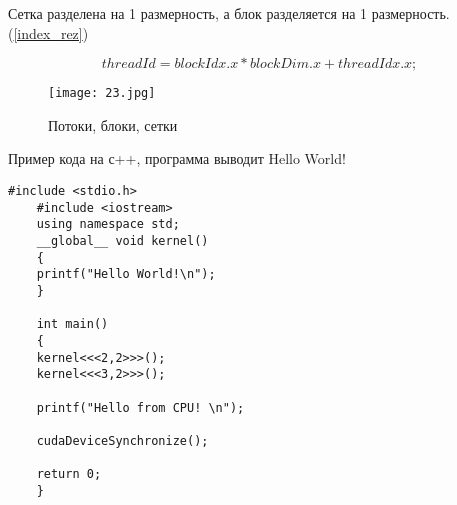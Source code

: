 \documentclass[a4paper, 12pt]{report}
\begin{document}
    Сетка разделена на 1 размерность, а блок разделяется на 1 размерность.(\ref{index_rez})

    \begin{equation}
       	threadId = blockIdx.x *blockDim.x + threadIdx.x;  		
        \label{index_rez}
    \end{equation}

        \begin{figure}[!h]
    \centering
    \texttt{[image: 23.jpg]}
    \caption{Потоки, блоки, сетки}
    \label{}
    \end{figure}

    Пример кода на с++, программа выводит Hello World!
    \begin{lstlisting}[label=some-code,caption= Первый код]
    #include <stdio.h>
    #include <iostream>
    using namespace std;
    __global__ void kernel()
    {
    printf("Hello World!\n");
    }

    int main()
    {
    kernel<<<2,2>>>();
    kernel<<<3,2>>>();

    printf("Hello from CPU! \n");

    cudaDeviceSynchronize();

    return 0;
    }   

    \end{lstlisting}

 
\end{document}
